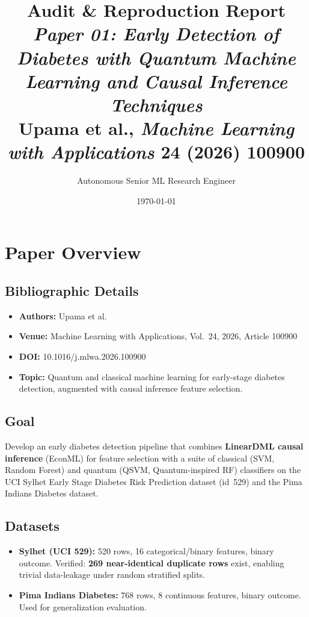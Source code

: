 \documentclass[12pt,a4paper]{article}
\title{\textbf{Audit \& Reproduction Report}\\[0.4em]
\large\textit{Paper 01: Early Detection of Diabetes with Quantum Machine Learning and Causal Inference Techniques}\\[0.3em]
Upama et al., \textit{Machine Learning with Applications} 24 (2026) 100900}
\author{Autonomous Senior ML Research Engineer}
\date{\today}
\begin{document}
\maketitle
\tableofcontents
\newpage

\section{Paper Overview}
\subsection{Bibliographic Details}
\begin{itemize}[leftmargin=*]
  \item \textbf{Authors:} Upama et al.
  \item \textbf{Venue:} Machine Learning with Applications, Vol.~24, 2026, Article 100900
  \item \textbf{DOI:} 10.1016/j.mlwa.2026.100900
  \item \textbf{Topic:} Quantum and classical machine learning for early-stage diabetes detection, augmented with causal inference feature selection.
\end{itemize}

\subsection{Goal}
Develop an early diabetes detection pipeline that combines \textbf{LinearDML causal inference} (EconML) for feature selection with a suite of classical (SVM, Random Forest) and quantum (QSVM, Quantum-inspired RF) classifiers on the UCI Sylhet Early Stage Diabetes Risk Prediction dataset (id~529) and the Pima Indians Diabetes dataset.

\subsection{Datasets}
\begin{itemize}[leftmargin=*]
  \item \textbf{Sylhet (UCI 529):} 520 rows, 16 categorical/binary features, binary outcome. Verified: \textbf{269 near-identical duplicate rows} exist, enabling trivial data-leakage under random stratified splits.
  \item \textbf{Pima Indians Diabetes:} 768 rows, 8 continuous features, binary outcome. Used for generalization evaluation.
\end{itemize}
\end{document}
